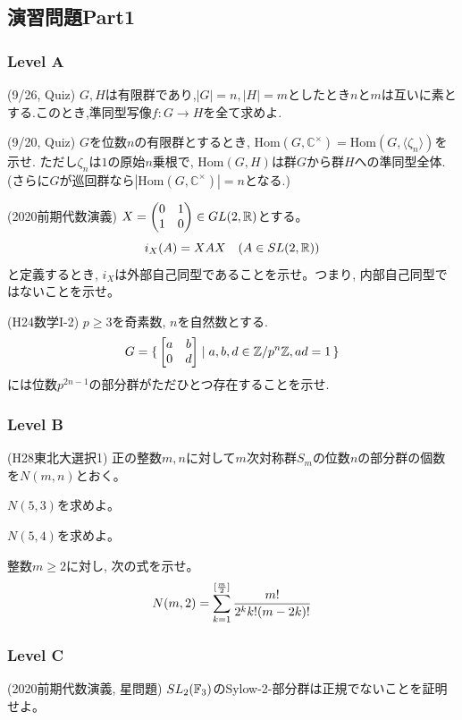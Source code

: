 \clearpage
\subsection{演習問題Part1}
\subsubsection{Level A}
\begin{prob} (9/26, Quiz)
$G,H$は有限群であり,$|G|=n,|H|=m$としたとき$n$と$m$は互いに素とする.このとき,準同型写像$f:G\to H$を全て求めよ.
\end{prob}

\begin{prob} (9/20, Quiz)
$G$を位数$n$の有限群とするとき, $\text{Hom}(G, \mathbb{C}^{\times})=\text{Hom}(G, \langle \zeta_n\rangle )$を示せ. ただし$\zeta_n$は$1$の原始$n$乗根で, $\text{Hom}(G, H)$は群$G$から群$H$への準同型全体. (さらに$G$が巡回群なら$|\text{Hom}(G, \mathbb{C}^{\times})|=n$となる.)
\end{prob}

\begin{prob} (2020前期代数演義)
$X=\begin{pmatrix} 0 & 1 \\ 1 & 0 \end{pmatrix} \in GL(2,\mathbb{R})$とする。
\[i_X(A) = XAX\quad (A\in SL(2,\mathbb{R}))\]
と定義するとき, $i_{X}$は外部自己同型であることを示せ。つまり, 内部自己同型ではないことを示せ。
\end{prob}


\begin{prob} (H24数学I-2)
$p\geq 3$を奇素数, $n$を自然数とする.
\[G = \set{\begin{bmatrix}a&b\\ 0&d\end{bmatrix} \mid a,b,d\in \mathbb{Z}/p^n\mathbb{Z}, ad=1}\]
には位数$p^{2n-1}$の部分群がただひとつ存在することを示せ.
\end{prob}


\subsubsection{Level B}


\begin{prob} (H28東北大選択1)
正の整数$m,n$に対して$m$次対称群$S_m$の位数$n$の部分群の個数を$N(m,n)$とおく。
\ben
\item $N(5,3)$を求めよ。
\item $N(5,4)$を求めよ。
\item 整数$m\geq 2$に対し, 次の式を示せ。
\[N(m,2) = \displaystyle\sum_{k=1}^{[\frac{m}{2}]} \dfrac{m!}{2^{k}k!(m-2k)!}\]
\een
\end{prob}

\subsubsection{Level C}
\begin{prob} (2020前期代数演義, 星問題)
$SL_{2}(\mathbb{F}_{3})$のSylow-2-部分群は正規でないことを証明せよ。
\end{prob}

